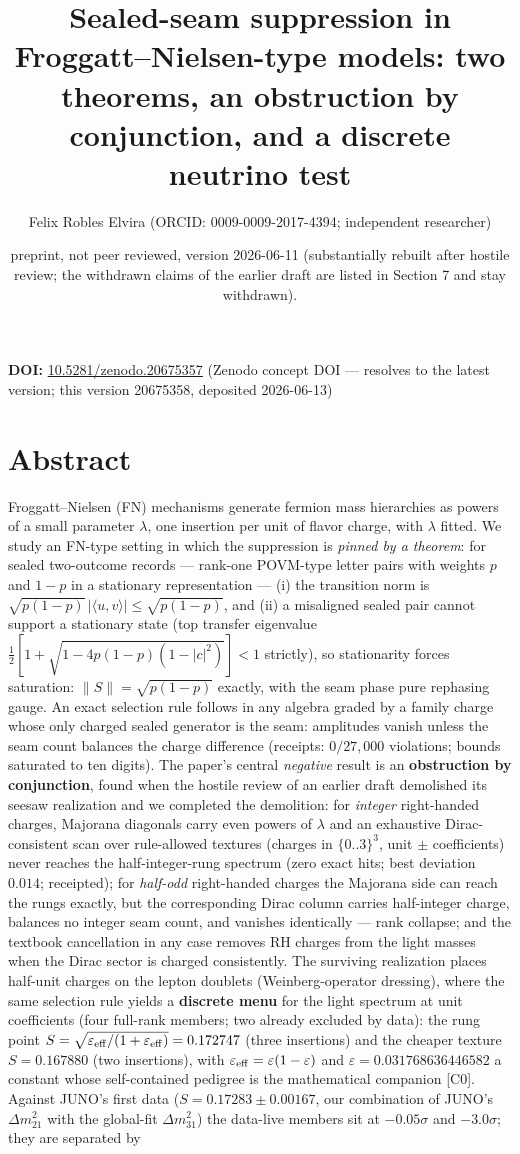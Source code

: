 \documentclass[11pt]{article}
\title{Sealed-seam suppression in Froggatt–Nielsen-type models: two theorems, an obstruction by conjunction, and a discrete neutrino test}
\author{Felix Robles Elvira (ORCID: 0009-0009-2017-4394; independent researcher)}
\date{\small preprint, not peer reviewed, version 2026-06-11 (substantially rebuilt after hostile review; the withdrawn claims of the earlier draft are listed in Section 7 and stay withdrawn).}
\begin{document}
\maketitle

\textbf{DOI:} \href{https://doi.org/10.5281/zenodo.20675357}{10.5281/zenodo.20675357} (Zenodo concept DOI — resolves to the latest version; this version 20675358, deposited 2026-06-13)

\section*{Abstract}
Froggatt–Nielsen (FN) mechanisms generate fermion mass hierarchies as powers of a small parameter $\lambda$, one insertion per unit of flavor charge, with $\lambda$ fitted.  We study an FN-type setting in which the suppression is \emph{pinned by a theorem}: for sealed two-outcome records — rank-one POVM-type letter pairs with weights $p$ and $1-p$ in a stationary representation — (i) the transition norm is $\sqrt{p(1-p)}\,|\langle u,v\rangle| \le \sqrt{p(1-p)}$, and (ii) a misaligned sealed pair cannot support a stationary state (top transfer eigenvalue $\tfrac12[1+\sqrt{1-4p(1-p) (1-|c|^2)}] < 1$ strictly), so stationarity forces saturation: $\lVert S\rVert = \sqrt{p(1-p)}$ exactly, with the seam phase pure rephasing gauge.  An exact selection rule follows in any algebra graded by a family charge whose only charged sealed generator is the seam: amplitudes vanish unless the seam count balances the charge difference (receipts: $0/27{,}000$ violations; bounds saturated to ten digits).  The paper's central \emph{negative} result is an \textbf{obstruction by conjunction}, found when the hostile review of an earlier draft demolished its seesaw realization and we completed the demolition: for \emph{integer} right-handed charges, Majorana diagonals carry even powers of $\lambda$ and an exhaustive Dirac-consistent scan over rule-allowed textures (charges in $\{0..3\}^3$, unit $\pm$ coefficients) never reaches the half-integer-rung spectrum (zero exact hits; best deviation $0.014$; receipted); for \emph{half-odd} right-handed charges the Majorana side can reach the rungs exactly, but the corresponding Dirac column carries half-integer charge, balances no integer seam count, and vanishes identically — rank collapse; and the textbook cancellation in any case removes RH charges from the light masses when the Dirac sector is charged consistently.  The surviving realization places half-unit charges on the lepton doublets (Weinberg-operator dressing), where the same selection rule yields a \textbf{discrete menu} for the light spectrum at unit coefficients (four full-rank members; two already excluded by data): the rung point $S = \sqrt{\varepsilon_{\rm eff}/(1+\varepsilon_{\rm eff})} = 0.172747$ (three insertions) and the cheaper texture $S = 0.167880$ (two insertions), with $\varepsilon_{\rm eff} = \varepsilon(1-\varepsilon)$ and $\varepsilon = 0.031768636446582$ a constant whose self-contained pedigree is the mathematical companion [C0].  Against JUNO's first data ($S = 0.17283 \pm 0.00167$, our combination of JUNO's $\Delta m^2_{21}$ with the global-fit $\Delta m^2_{31}$) the data-live members sit at $-0.05\sigma$ and $-3.0\sigma$; they are separated by 
\end{document}
